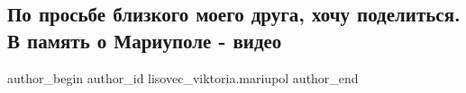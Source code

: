  
 
 
 
 

\subsection{По просьбе близкого моего друга, хочу поделиться. В память о Мариуполе - видео}
\label{sec:07_02_2023.fb.lisovec_viktoria.mariupol.1.po_prosbe_blizkogo_m}

\ifcmt
 author_begin
   author_id lisovec_viktoria.mariupol
 author_end
\fi

